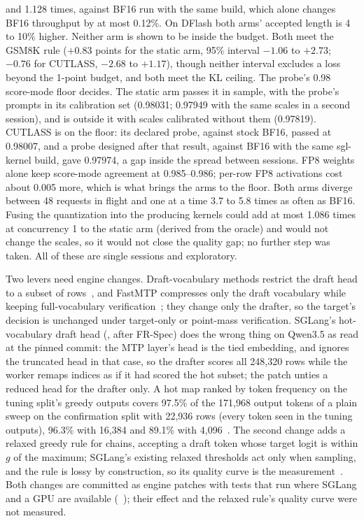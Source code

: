 and 1.128 times, against BF16 run with the same build, which alone changes BF16 throughput by at most 0.12\%. On DFlash both arms' accepted length is 4 to 10\% higher. Neither arm is shown to be inside the budget. Both meet the GSM8K rule ($+0.83$ points for the static arm, 95\% interval $-1.06$ to $+2.73$; $-0.76$ for CUTLASS, $-2.68$ to $+1.17$), though neither interval excludes a loss beyond the 1-point budget, and both meet the KL ceiling. The probe's 0.98 score-mode floor decides. The static arm passes it in sample, with the probe's prompts in its calibration set (0.98031; 0.97949 with the same scales in a second session), and is outside it with scales calibrated without them (0.97819). CUTLASS is on the floor: its declared probe, against stock BF16, passed at 0.98007, and a probe designed after that result, against BF16 with the same sgl-kernel build, gave 0.97974, a gap inside the spread between sessions. FP8 weights alone keep score-mode agreement at 0.985--0.986; per-row FP8 activations cost about 0.005 more, which is what brings the arms to the floor. Both arms diverge between 48 requests in flight and one at a time 3.7 to 5.8 times as often as BF16. Fusing the quantization into the producing kernels could add at most 1.086 times at concurrency 1 to the static arm (derived from the oracle) and would not change the scales, so it would not close the quality gap; no further step was taken. All of these are single sessions and exploratory.

Two levers need engine changes. Draft-vocabulary methods restrict the draft head to a subset of rows~\cite{frspec,vocabtrim,specvocab,dynaspec,microspec}, and FastMTP compresses only the draft vocabulary while keeping full-vocabulary verification~\cite{fastmtp}; they change only the drafter, so the target's decision is unchanged under target-only or point-mass verification. SGLang's hot-vocabulary draft head (, after FR-Spec) does the wrong thing on Qwen3.5 as read at the pinned commit: the MTP layer's head is the tied embedding, and  ignores the truncated head in that case, so the drafter scores all 248,320 rows while the worker remaps indices as if it had scored the hot subset; the patch unties a reduced head for the drafter only. A hot map ranked by token frequency on the tuning split's greedy outputs covers 97.5\% of the 171,968 output tokens of a plain sweep on the confirmation split with 22,936 rows (every token seen in the tuning outputs), 96.3\% with 16,384 and 89.1\% with 4,096~. The second change adds a relaxed greedy rule for chains, accepting a draft token whose target logit is within $g$ of the maximum; SGLang's existing relaxed thresholds act only when sampling, and the rule is lossy by construction, so its quality curve is the measurement~\cite{marginsnotwindows}. Both changes are committed as engine patches with tests that run where SGLang and a GPU are available (~); their effect and the relaxed rule's quality curve were not measured.

